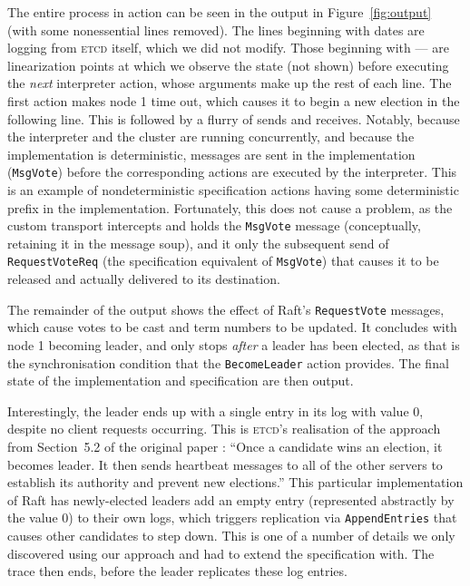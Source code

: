 \documentclass[a4paper]{article}
\newcommand{\tname}[1]{\textsc{#1}\xspace}
\newcommand{\etcd}{\tname{etcd}}
\begin{document}
The entire process in action can be seen in the output in Figure~\ref{fig:output} (with some nonessential lines removed).
%
The lines beginning with dates are logging from \etcd itself, which we did not modify.
%
Those beginning with --- are linearization points at which we observe the state (not shown) before executing the \emph{next} interpreter action, whose arguments make up the rest of each line.
%
The first action makes node 1 time out, which causes it to begin a new election in the following line.
%
This is followed by a flurry of sends and receives.
%
Notably, because the interpreter and the cluster are running concurrently, and because the implementation is deterministic, messages are sent in the implementation (\texttt{MsgVote}) before the corresponding actions are executed by the interpreter.
%
This is an example of nondeterministic specification actions having some deterministic prefix in the implementation.
%
Fortunately, this does not cause a problem, as the custom transport intercepts and holds the \texttt{MsgVote} message (conceptually, retaining it in the message soup), and it only the subsequent send of \texttt{RequestVoteReq} (the specification equivalent of \texttt{MsgVote}) that causes it to be released and actually delivered to its destination.

The remainder of the output shows the effect of Raft's \texttt{RequestVote} messages, which cause votes to be cast and term numbers to be updated.
%
It concludes with node 1 becoming leader, and only stops \emph{after} a leader has been elected, as that is the synchronisation condition that the \texttt{BecomeLeader} action provides.
%
The final state of the implementation and specification are then output.

Interestingly, the leader ends up with a single entry in its log with value 0, despite no client requests occurring.
%
This is \etcd's realisation of the approach from Section~5.2 of the original paper \cite{ongaro_search_2014}: ``Once a candidate wins an election, it becomes leader.
%
It then sends heartbeat messages to all of the other servers to establish its authority and prevent new elections.'' This particular implementation of Raft has newly-elected leaders add an empty entry (represented abstractly by the value 0) to their own logs, which triggers replication via \texttt{AppendEntries} that causes other candidates to step down.
%
This is one of a number of details we only discovered using our approach and had to extend the specification with.
%
The trace then ends, before the leader replicates these log entries.
\end{document}
